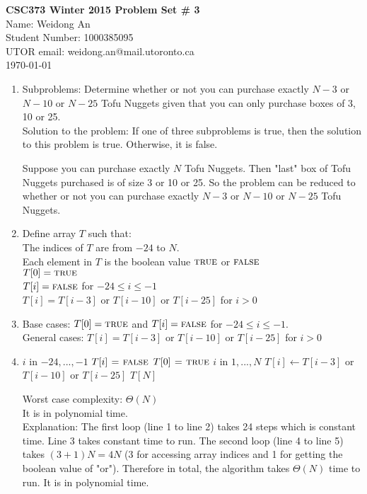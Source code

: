 \documentclass[11pt]{article}
\begin{document}
\begin{center}
{\bf \Large \bf CSC373 Winter 2015 Problem Set \# 3}\\
Name: Weidong An\\
Student Number: 1000385095\\
UTOR email: weidong.an@mail.utoronto.ca\\
\today\\
\end{center}

\begin{enumerate}[label=(\alph*)]
\item
Subproblems: Determine whether or not you can purchase exactly $N-3$ or $N-10$ or $N-25$ Tofu Nuggets given that
you can only purchase boxes of 3, 10 or 25.\\
Solution to the problem: If one of three subproblems is true, then the solution to this problem is true. Otherwise, it is false.

Suppose you can purchase exactly $N$ Tofu Nuggets. Then "last" box of Tofu Nuggets purchased is of size 3 or 10 or 25. So the problem can be reduced to whether or not you can purchase exactly $N-3$ or $N-10$ or $N-25$ Tofu Nuggets.

\item
Define array $T$ such that:\\
The indices of $T$ are from $-24$ to $N$.\\
Each element in $T$ is the boolean value $\textnormal{\scshape true}$ or $\textnormal{\scshape false}$\\
$T[0] = \textnormal{\scshape true}$\\
$T[i] = \textnormal{\scshape false}$ for $-24\leq i \leq -1$ \\
$T[i] = T[i-3]$ or $T[i-10]$ or $T[i-25]$ for $i > 0$\\

\item
Base cases: $T[0]=\textnormal{\scshape true}$ and $T[i]=\textnormal{\scshape false}$ for $ -24\leq i \leq -1$.\\
General cases: $T[i] = T[i-3]$ or $T[i-10]$ or $T[i-25]$ for $i >0$

\item

\begin{codebox}
\li \For $i$ in $-24, ..., -1$ 
\li      \Then $T[i] \mathrel{\hspace{1pt}=\hspace{1pt}} \textnormal{\scshape false}$\End
\li $T[0] \mathrel{\hspace{1pt}=\hspace{1pt}} \textnormal{\scshape true}$
\li \For $i$ in $1,..., N$
\li      \Then $T[i]\gets T[i-3]$ or $T[i-10]$ or $T[i-25]$\End
\li \Return $T[N]$
\end{codebox}

Worst case complexity: $\Theta(N)$\\
It is in polynomial time.\\
Explanation: The first loop (line 1 to line 2) takes 24 steps which is constant time. Line 3 takes constant time to run. The second loop (line 4 to line 5) takes $(3+1)N = 4N$ (3 for accessing array indices and 1 for getting the boolean value of "or"). Therefore in total, the algorithm takes $\Theta(N)$ time to run. It is in polynomial time.

\end{enumerate}
\end{document}
